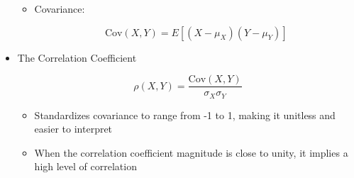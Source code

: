 \begin{itemize}
\begin{itemize}
      \item Covariance:

        $$\text{Cov}(X,Y)=E[(X-\mu_X)(Y-\mu_Y)]$$

    \end{itemize}

  \item The Correlation Coefficient

    $$\rho(X,Y)=\frac{\text{Cov}(X,Y)}{\sigma_X\sigma_Y}$$

    \begin{itemize}

      \item Standardizes covariance to range from -1 to 1, making it unitless and easier to interpret

      \item When the correlation coefficient magnitude is close to unity, it implies a high level of correlation

    \end{itemize}

\end{itemize}



